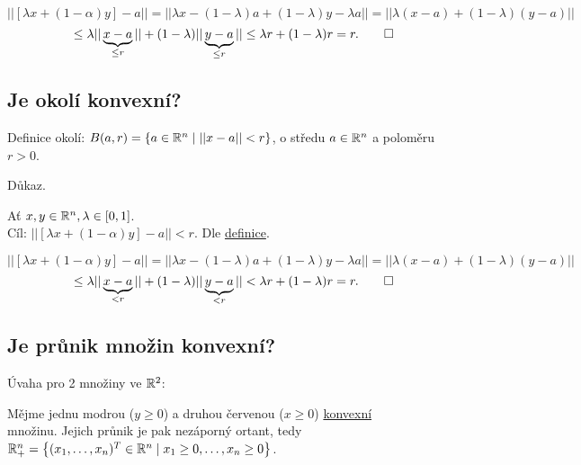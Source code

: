 \[
    || [\lambda x + (1-\alpha)y] - a || = || \lambda x - (1-\lambda)a + (1-\lambda)y - \lambda a || =
    || \lambda (x-a) + (1-\lambda)(y-a) ||
\]
\[
    \leq \lambda ||\underbrace{x-a}_{\leq r}|| +  (1-\lambda)||\underbrace{y-a}_{\leq r}|| \leq \lambda r + (1-\lambda)r
     = r. \qed
\]

\subsection{Je okolí konvexní?}
Definice okolí: $B(a,r) = \left\lbrace a \in \mathbb{R}^n \mid ||x -a || < r \right\rbrace$, o středu $a \in \mathbb{R}^n$ a poloměru $r > 0$.

Důkaz.

Ať $x,y \in \mathbb{R}^n, \lambda \in [0,1]$.\\
Cíl: $|| [\lambda x + (1-\alpha)y] - a || < r$. Dle \hyperref[sec:konvex]{definice}.

\[
    || [\lambda x + (1-\alpha)y] - a || = || \lambda x - (1-\lambda)a + (1-\lambda)y - \lambda a || =
    || \lambda (x-a) + (1-\lambda)(y-a) ||
\]
\[
    \leq \lambda ||\underbrace{x-a}_{< r}|| +  (1-\lambda)||\underbrace{y-a}_{< r}|| < \lambda r + (1-\lambda)r
     = r. \qed
\]

\subsection{Je průnik množin konvexní?}
Úvaha pro 2 množiny ve $\mathbb{R}^2$:

\begin{wrapfigure}{r}{0.25\textwidth}
    \vspace{-6em}
    \hspace*{-2em}
\end{wrapfigure}

Mějme jednu modrou ($y \geq 0$) a druhou červenou ($x \geq 0$) \hyperref[sec:konvex]{konvexní} \\ množinu. Jejich průnik 
je pak nezáporný ortant, tedy \\
$\mathbb{R}_+^n = \left\lbrace (x_1, \dots, x_n)^T \in \mathbb{R}^n \mid x_1 \geq 0, \dots, x_n \geq 0 \right\rbrace$.

